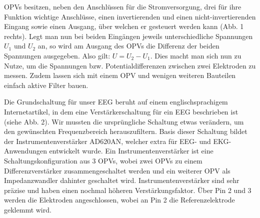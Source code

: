 \documentclass[10pt]{article}
\begin{document}
OPVs besitzen, neben den Anschlüssen für die Stromversorgung, drei für ihre Funktion wichtige Anschlüsse, einen invertierenden und einen nicht-invertierenden Eingang sowie einen 
Ausgang,  %
über welchen er gesteuert werden kann (Abb. 1 rechts).
Legt man nun bei beiden Eingängen jeweils unterschiedliche Spannungen $U_{1}$ und $U_{2}$ an, so wird am Ausgang des OPVs die Differenz der beiden Spannungen ausgegeben. 
Also gilt: $U = U_{2} - U_{1}$. 
Dies macht man sich nun zu Nutze, um die Spannungen bzw. Potentialdifferenzen zwischen zwei Elektroden zu messen. \cite{Nührmann} 
Zudem lassen sich mit einem OPV und wenigen weiteren Bauteilen einfach aktive Filter bauen.

Die Grundschaltung für unser EEG beruht auf einem englischsprachigem Internetartikel, in dem eine Verstärkerschaltung für ein EEG beschrieben ist (siehe Abb. 2). \cite{EEGSchaltung} 
Wir mussten die ursprüngliche Schaltung etwas verändern, um den gewünschten Frequenzbereich herauszufiltern.
Basis dieser Schaltung bildet der Instrumentenverstärker AD620AN, welcher extra für EEG- und EKG-Anwendungen entwickelt wurde. 
Ein Instrumentenverstärker ist eine Schaltungskonfiguration aus 3 OPVs, wobei zwei OPVs zu einem Differenzverstärker zusammengeschaltet werden und ein weiterer OPV als Impedanzwandler dahinter geschaltet wird.
Instrumentenverstärker sind sehr präzise und haben einen nochmal höheren Verstärkungsfaktor.
Über Pin 2 und 3 werden die Elektroden angeschlossen, wobei an Pin 2 die Referenzelektrode geklemmt wird. 
\end{document}
